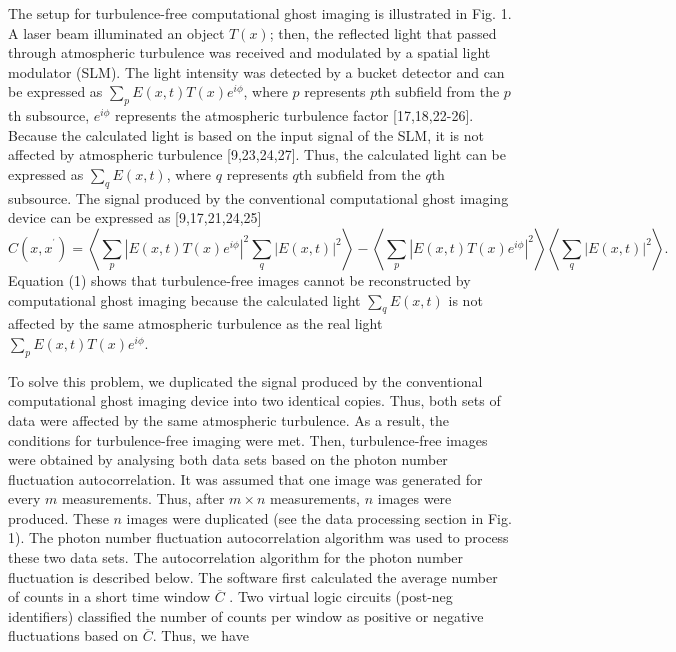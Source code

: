 \documentclass[letterpaper,10pt]{article}
\begin{document}
The setup for turbulence-free computational ghost imaging is illustrated in
Fig. 1. A laser beam illuminated an object $T(x)$; then, the reflected light
that passed through atmospheric turbulence was received and modulated by a
spatial light modulator (SLM). The light intensity was detected by a bucket
detector and can be expressed as $\sum_{p}E\left( x,t\right) T\left(
x\right) e^{i\phi }$, where $p$ represents $p$th subfield from the $p$th
subsource, $e^{i\phi }$ represents the atmospheric turbulence factor [17,18,22-26]. Because the
calculated light is based on the input signal of the SLM, it is not affected
by atmospheric turbulence [9,23,24,27]. Thus, the calculated
light can be expressed as $\sum_{q}E\left( x,t\right) $, where $q$ represents $q$th subfield from the $q$th
subsource. The signal produced
by the conventional computational ghost imaging device can be expressed as [9,17,21,24,25]
\begin{equation}
C\left( x,x^{^{\prime }}\right) =\left\langle \sum_{p}\left\vert E\left(
x,t\right) T\left( x\right) e^{i\phi }\right\vert ^{2}\sum_{q}\left\vert
E\left( x,t\right) \right\vert ^{2}\right\rangle -\left\langle
\sum_{p}\left\vert E\left( x,t\right) T\left( x\right) e^{i\phi }\right\vert
^{2}\right\rangle \left\langle \sum_{q}\left\vert E\left( x,t\right)
\right\vert ^{2}\right\rangle .
\end{equation}%
Equation (1) shows that turbulence-free images cannot be reconstructed by
computational ghost imaging because the calculated light $\sum_{q}E\left(
x,t\right) $ is not affected by the same atmospheric turbulence as the real
light $\sum_{p}E\left( x,t\right) T\left( x\right) e^{i\phi }$.

To solve this problem, we duplicated the signal produced by the conventional
computational ghost imaging device into two identical copies. Thus, both
sets of data were affected by the same atmospheric turbulence. As a result,
the conditions for turbulence-free imaging were met. Then, turbulence-free
images were obtained by analysing both data sets based on the photon number
fluctuation autocorrelation. It was assumed that one image was generated for
every $m$ measurements. Thus, after $m\times n$ measurements, $n$ images
were produced. These $n$ images were duplicated (see the data processing
section in Fig. 1). The photon number fluctuation autocorrelation algorithm
was used to process these two data sets. The autocorrelation algorithm for
the photon number fluctuation is described below. The software first
calculated the average number of counts in a short time window $\overline{C}$%
. Two virtual logic circuits (post-neg identifiers) classified the number of
counts per window as positive or negative fluctuations based on $\overline{C}
$. Thus, we have
\end{document}
